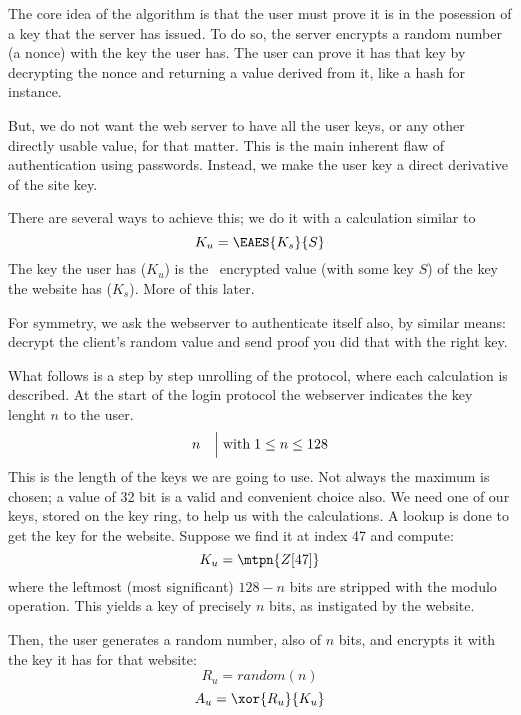 The core idea of the algorithm is that the user must prove it is in the posession of a key that the server has issued.
To do so, the server encrypts a random number (a nonce) with the key the user has.
The user can prove it has that key by decrypting the nonce and returning a value derived from it, like a hash for instance.
\par
But, we do not want the web server to have all the user keys, or any other directly usable value, for that matter.
This is the main inherent flaw of authentication using passwords.
Instead, we make the user key a direct derivative of the site key.
\par
There are several ways to achieve this; we do it with a calculation similar to
\[K_u = \EAES{K_s}{S}\]
The key the user has (\(K_u\)) is the \AES\ encrypted value (with some key \(S\)) of the key the website has (\(K_s\)).
More of this later.
\par
For symmetry, we ask the webserver to authenticate itself also, by similar means: decrypt the client's random value and send proof you did that with the right key.
\par
What follows is a step by step unrolling of the protocol, where each calculation is described.
At the start of the login protocol the webserver indicates the key lenght \(n\) to the user.
\[n\quad\Bigl\lvert\thickspace\text{with}\thickspace 1\le{n}\le128\]
This is the length of the keys we are going to use.
Not always the maximum is chosen; a value of 32 bit is a valid and convenient choice also.
We need one of our keys, stored on the key ring, to help us with the calculations.
A lookup is done to get the key for the website.
Suppose we find it at index 47 and compute:
\begin{equation}\label{rud:uku}
K_u = \mtpn{Z[47]}
\end{equation}
where the leftmost (most significant) $128 - n$ bits are stripped with the modulo operation.
This yields a key of precisely $n$ bits, as instigated by the website.
\par
Then, the user generates a random number, also of \(n\) bits, and encrypts it with the key it has for that website:
\begin{equation}\label{rud:uru}
R_u = random(n)
\end{equation}
\begin{equation}\label{rud:au}
A_u = \xor{R_u}{K_u}
\end{equation}
